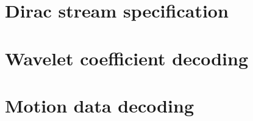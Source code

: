 


\section{Dirac stream specification}

\clearpage
\section{Wavelet coefficient decoding}

\clearpage
\section{Motion data decoding}
